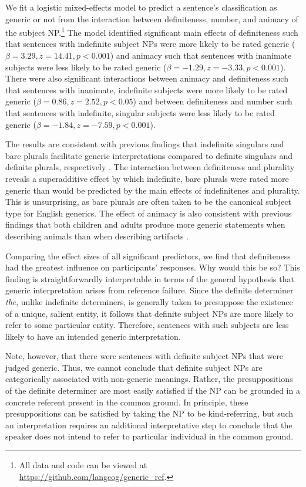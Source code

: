 \documentclass[10pt,letterpaper]{article}
\begin{document}
We fit a logistic mixed-effects model to predict a sentence's classification as generic or not from the interaction between definiteness, number, and animacy of the subject NP.\footnote{All data and code can be viewed at \url{https://github.com/langcog/generic_ref}.} The model identified significant main effects of definiteness such that sentences with indefinite subject NPs were more likely to be rated generic (\(\beta = 3.29, z = 14.41, p < 0.001\)) and animacy such that sentences with inanimate subjects were less likely to be rated generic (\(\beta = -1.29, z = -3.33, p < 0.001\)). There were also significant interactions between animacy and definiteness such that sentences with inanimate, indefinite subjects were more likely to be rated generic (\(\beta = 0.86, z = 2.52, p < 0.05\)) and between definiteness and number such that sentences with indefinite, singular subjects were less likely to be rated generic (\(\beta = -1.84, z = -7.59, p < 0.001\)).

The results are consistent with previous findings that indefinite singulars and bare plurals facilitate generic interpretations compared to definite singulars and definite plurals, respectively \cite{Cimpian:2011, Gelman:2003}. The interaction between definiteness and plurality reveals a superadditive effect by which indefinite, bare plurals were rated more generic than would be predicted by the main effects of indefinitenes and plurality. This is unsurprising, as bare plurals are often taken to be the canonical subject type for English generics. The effect of animacy is also consistent with previous findings that both children and adults produce more generic statements when describing animals than when describing artifacts \cite{Brandone:2009}.

Comparing the effect sizes of all significant predictors, we find that definiteness had the greatest influence on participants' responses. Why would this be so? This finding is straightforwardly interpretable in terms of the general hypothesis that generic interpretation arises from reference failure. Since the definite determiner \textit{the}, unlike indefinite determiners, is generally taken to presuppose the existence of a unique, salient entity, it follows that definite subject NPs are more likely to refer to some particular entity. Therefore, sentences with such subjects are less likely to have an intended generic interpretation. 

Note, however, that there were sentences with definite subject NPs that were judged generic. Thus, we cannot conclude that definite subject NPs are categorically associated with non-generic meanings. Rather, the presuppositions of the definite determiner are most easily satisfied if the NP can be grounded in a concrete referent present in the common ground. In principle, these presuppositions can be satisfied by taking the NP to be kind-referring, but such an interpretation requires an additional interpretative step to conclude that the speaker does not intend to refer to particular individual in the common ground.
\end{document}
